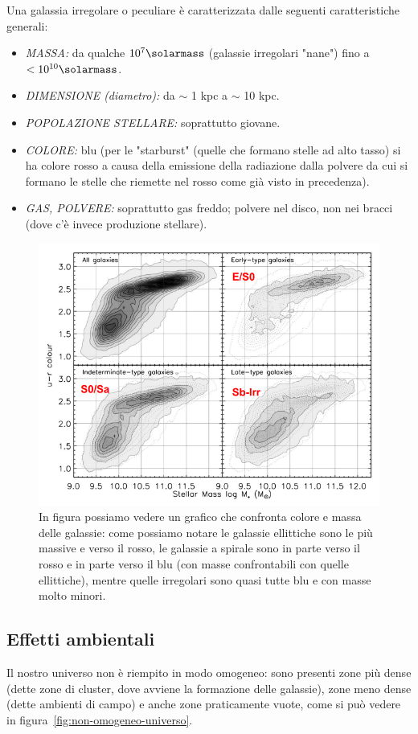 Una galassia irregolare o peculiare è caratterizzata dalle seguenti caratteristiche generali:

\begin{itemize}
	\item \emph{MASSA:} da qualche $10^7 \si{\solarmass}$ (galassie irregolari "nane") fino a $< 10^{10} \si{\solarmass}$.
	\item \emph{DIMENSIONE (diametro):} da $\sim$ 1 kpc a $\sim$ 10 kpc.
	\item \emph{POPOLAZIONE STELLARE:} soprattutto giovane.
	\item \emph{COLORE:} blu (per le "starburst" (quelle che formano stelle ad alto tasso) si ha colore rosso a causa della emissione della radiazione dalla polvere da cui si formano le stelle che riemette nel rosso come già visto in precedenza).
	\item \emph{GAS, POLVERE:} soprattutto gas freddo; polvere nel disco, non nei bracci (dove c'è invece produzione stellare).
\end{itemize}

\begin{figure}[htb]
	\centering
	\includegraphics[width = 0.5 \textwidth ]{immagini/galassie-colore-massa-stellare.png}
	\caption{In figura possiamo vedere un grafico che confronta colore e massa delle galassie: come possiamo notare le galassie ellittiche sono le più massive e verso il rosso, le galassie a spirale sono in parte verso il rosso e in parte verso il blu (con masse confrontabili con quelle ellittiche), mentre quelle irregolari sono quasi tutte blu e con masse molto minori.}
	\label{fig:galassie-colore-massastellare}
\end{figure}
\subsection{Effetti ambientali}
Il nostro universo non è riempito in modo omogeneo: sono presenti zone più dense (dette zone di cluster, dove avviene la formazione delle galassie), zone meno dense (dette ambienti di campo) e anche zone praticamente vuote, come si può vedere in figura~\ref{fig:non-omogeneo-universo}.

